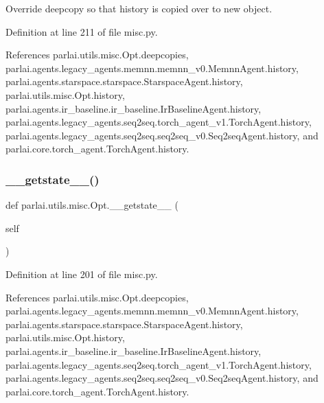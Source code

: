 \begin{DoxyVerb}Override deepcopy so that history is copied over to new object.\end{DoxyVerb}
 

Definition at line 211 of file misc.\+py.



References parlai.\+utils.\+misc.\+Opt.\+deepcopies, parlai.\+agents.\+legacy\+\_\+agents.\+memnn.\+memnn\+\_\+v0.\+Memnn\+Agent.\+history, parlai.\+agents.\+starspace.\+starspace.\+Starspace\+Agent.\+history, parlai.\+utils.\+misc.\+Opt.\+history, parlai.\+agents.\+ir\+\_\+baseline.\+ir\+\_\+baseline.\+Ir\+Baseline\+Agent.\+history, parlai.\+agents.\+legacy\+\_\+agents.\+seq2seq.\+torch\+\_\+agent\+\_\+v1.\+Torch\+Agent.\+history, parlai.\+agents.\+legacy\+\_\+agents.\+seq2seq.\+seq2seq\+\_\+v0.\+Seq2seq\+Agent.\+history, and parlai.\+core.\+torch\+\_\+agent.\+Torch\+Agent.\+history.

\mbox{\label{classparlai_1_1utils_1_1misc_1_1Opt_a7fae2d1b6ffb48970e59923787adb905}} 
\subsubsection{\texorpdfstring{\+\_\+\+\_\+getstate\+\_\+\+\_\+()}{\_\_getstate\_\_()}}
{\footnotesize\ttfamily def parlai.\+utils.\+misc.\+Opt.\+\_\+\+\_\+getstate\+\_\+\+\_\+ (\begin{DoxyParamCaption}\item[{}]{self }\end{DoxyParamCaption})}



Definition at line 201 of file misc.\+py.



References parlai.\+utils.\+misc.\+Opt.\+deepcopies, parlai.\+agents.\+legacy\+\_\+agents.\+memnn.\+memnn\+\_\+v0.\+Memnn\+Agent.\+history, parlai.\+agents.\+starspace.\+starspace.\+Starspace\+Agent.\+history, parlai.\+utils.\+misc.\+Opt.\+history, parlai.\+agents.\+ir\+\_\+baseline.\+ir\+\_\+baseline.\+Ir\+Baseline\+Agent.\+history, parlai.\+agents.\+legacy\+\_\+agents.\+seq2seq.\+torch\+\_\+agent\+\_\+v1.\+Torch\+Agent.\+history, parlai.\+agents.\+legacy\+\_\+agents.\+seq2seq.\+seq2seq\+\_\+v0.\+Seq2seq\+Agent.\+history, and parlai.\+core.\+torch\+\_\+agent.\+Torch\+Agent.\+history.



